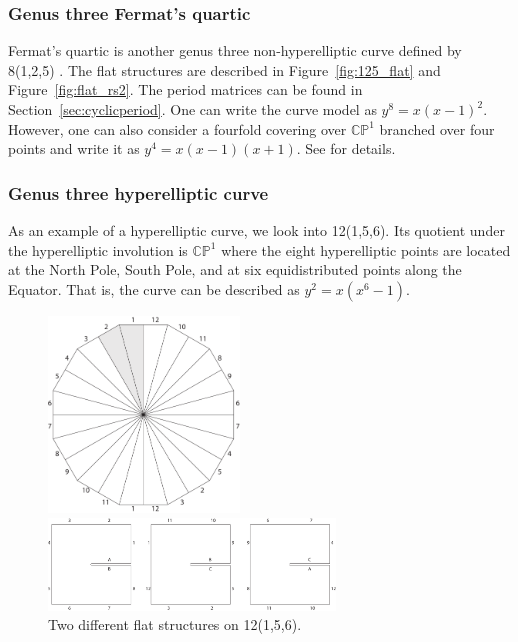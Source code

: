 \documentclass[12pt,reqno]{amsart}
\newcommand{\C}{\mathbb{C}}
\renewcommand{\P}{\mathbb{P}}
\theoremstyle{definition}
\theoremstyle{remark}
\begin{document}
\subsubsection{Genus three Fermat's quartic}
Fermat's quartic is another genus three non-hyperelliptic curve defined by 8(1,2,5) \cite{dami}. The flat structures are described in Figure~\ref{fig:125_flat} and Figure~\ref{fig:flat_rs2}. The period matrices can be found in Section~\ref{sec:cyclicperiod}. One can write the curve model as $y^8 = x (x-1)^2.$ However, one can also consider a fourfold covering over $\C\P^1$ branched over four points and write it as $y^4 = x (x-1) (x+1).$ See \cite{dami} for details.

\subsubsection{Genus three hyperelliptic curve}
As an example of a hyperelliptic curve, we look into 12(1,5,6). Its quotient under the hyperelliptic involution is $\C\P^1$ where the eight hyperelliptic points are located at the North Pole, South Pole, and at six equidistributed points along the Equator. That is, the curve can be described as $y^2 = x(x^6 -1).$

\begin{figure}[htbp]
\centering
\begin{minipage}{0.5\textwidth}
	\centering
	\includegraphics[width=2in]{figures/156_flat.pdf}
\end{minipage}%
\begin{minipage}{0.5\textwidth}
	\centering
	\includegraphics[width=3in]{figures/156_flat_2.pdf}
\end{minipage}
	\caption{Two different flat structures on 12(1,5,6).}
	\label{fig:156}
\end{figure}
\end{document}

